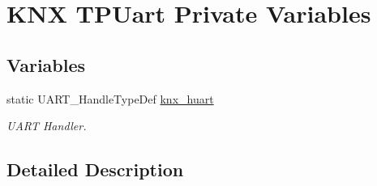 \hypertarget{group___k_n_x___p_h___t_p_u_a_r_t___private___variables}{}\section{K\+NX T\+P\+Uart Private Variables}
\label{group___k_n_x___p_h___t_p_u_a_r_t___private___variables}
\subsection*{Variables}
\begin{DoxyCompactItemize}
\item 
static U\+A\+R\+T\+\_\+\+Handle\+Type\+Def \hyperlink{group___k_n_x___p_h___t_p_u_a_r_t___private___variables_ga9308eecc1a4f261fab20bd754fd5d5fc}{knx\+\_\+huart}\hypertarget{group___k_n_x___p_h___t_p_u_a_r_t___private___variables_ga9308eecc1a4f261fab20bd754fd5d5fc}{}\label{group___k_n_x___p_h___t_p_u_a_r_t___private___variables_ga9308eecc1a4f261fab20bd754fd5d5fc}

\begin{DoxyCompactList}\small\item\em U\+A\+RT Handler. \end{DoxyCompactList}\end{DoxyCompactItemize}


\subsection{Detailed Description}
